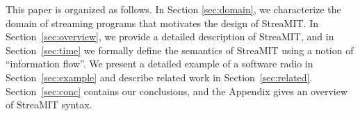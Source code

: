 This paper is organized as follows. In Section {\ref{sec:domain}}, we
characterize the domain of streaming programs that motivates the
design of StreaMIT.  In Section~\ref{sec:overview}, we provide a
detailed description of StreaMIT, and in Section~\ref{sec:time} we
formally define the semantics of StreaMIT using a notion of
``information flow''. We present a detailed example of a software
radio in Section~\ref{sec:example} and describe related work in
Section~\ref{sec:related}.  Section~\ref{sec:conc} contains our
conclusions, and the Appendix gives an overview of StreaMIT syntax.


